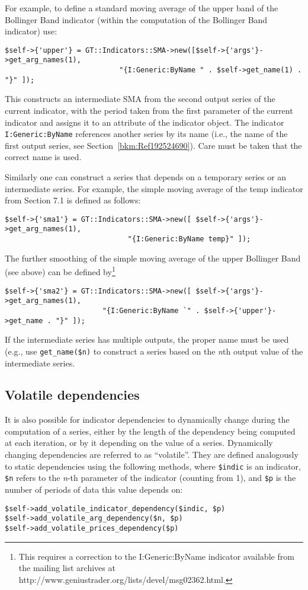 \documentclass[11pt,twoside]{article}
\begin{document}
For example, to define a standard moving average of the upper band of
the Bollinger Band indicator (within the computation of the Bollinger Band indicator) use:
\begin{lstlisting}[numbers=none]
$self->{'upper'} = GT::Indicators::SMA->new([$self->{'args'}->get_arg_names(1),
                           "{I:Generic:ByName " . $self->get_name(1) . "}" ]);
\end{lstlisting}
This constructs an intermediate SMA from the second output series of
the current indicator, with the period taken from the first parameter
of the current indicator and assigns it to an attribute of the
indicator object. The indicator \lstinline!I:Generic:ByName! references
another series by its name (i.e., the name of the first output series, 
see Section~\ref{bkm:Ref192524690}). Care must be taken that the correct
name is used.

Similarly one can construct a series that depends on a temporary series
or an intermediate series. For example, the simple moving average of the
temp indicator from Section 7.1 is defined as follows:
\begin{lstlisting}[numbers=none]
$self->{'sma1'} = GT::Indicators::SMA->new([ $self->{'args'}->get_arg_names(1),
                             "{I:Generic:ByName temp}" ]);
\end{lstlisting}
The further smoothing of the simple moving average of the upper Bollinger
Band (see above) can be defined by\footnote{This requires a correction 
to the I:Generic:ByName indicator available from the mailing list archives 
at http://www.geniustrader.org/lists/devel/msg02362.html.}
\begin{lstlisting}[numbers=none]
$self->{'sma2'} = GT::Indicators::SMA->new([ $self->{'args'}->get_arg_names(1),
                       "{I:Generic:ByName `" . $self->{'upper'}->get_name . "}" ]);
\end{lstlisting}
If the intermediate series has multiple outputs, the proper name must be used
(e.g., use \lstinline!get_name($n)! to construct a series based on the 
{\em n}th output value of the intermediate series.

\subsection[Volatile dependencies]{\label{bkm:Ref192505424}Volatile
dependencies}
It is also possible for indicator dependencies to dynamically change
during the computation of a series, either by the length of the
dependency being computed at each iteration, or by it depending on the
value of a series. Dynamically changing dependencies are referred to as
``volatile''. They are defined analogously to static dependencies using
the following methods, where \lstinline!$indic! is an
indicator, \lstinline!$n! refers to the \textit{n}-th
parameter of the indicator (counting from 1), and
\lstinline!$p! is the number of periods of data this value
depends on:
\begin{lstlisting}[numbers=none]
$self->add_volatile_indicator_dependency($indic, $p)
$self->add_volatile_arg_dependency($n, $p)
$self->add_volatile_prices_dependency($p)
\end{lstlisting}
\end{document}

